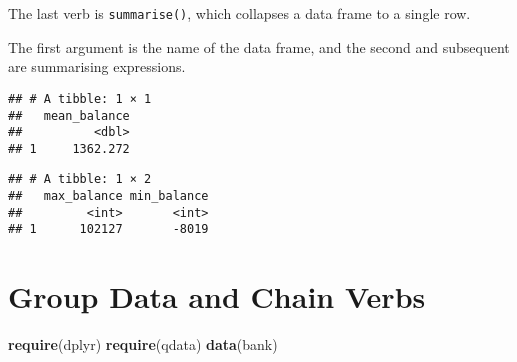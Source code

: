 \documentclass[]{book}
\newenvironment{Shaded}{\begin{snugshade}}{\end{snugshade}}
\newcommand{\KeywordTok}[1]{\textcolor[rgb]{0.13,0.29,0.53}{\textbf{{#1}}}}
\newcommand{\DataTypeTok}[1]{\textcolor[rgb]{0.13,0.29,0.53}{{#1}}}
\newcommand{\StringTok}[1]{\textcolor[rgb]{0.31,0.60,0.02}{{#1}}}
\newcommand{\CommentTok}[1]{\textcolor[rgb]{0.56,0.35,0.01}{\textit{{#1}}}}
\newcommand{\OtherTok}[1]{\textcolor[rgb]{0.56,0.35,0.01}{{#1}}}
\newcommand{\NormalTok}[1]{{#1}}
\begin{document}
The last verb is \texttt{summarise()}, which collapses a data frame to a
single row.

The first argument is the name of the data frame, and the second and
subsequent are summarising expressions.

\begin{Shaded}
\end{Shaded}

\begin{verbatim}
## # A tibble: 1 × 1
##   mean_balance
##          <dbl>
## 1     1362.272
\end{verbatim}

\begin{Shaded}
\end{Shaded}

\begin{verbatim}
## # A tibble: 1 × 2
##   max_balance min_balance
##         <int>       <int>
## 1      102127       -8019
\end{verbatim}

\clearpage

\section{Group Data and Chain Verbs}\label{group-data-and-chain-verbs}

\begin{Shaded}
\begin{Highlighting}[]
\KeywordTok{require}\NormalTok{(dplyr)}
\KeywordTok{require}\NormalTok{(qdata)}
\KeywordTok{data}\NormalTok{(bank)}
\end{Highlighting}
\end{Shaded}
\end{document}
